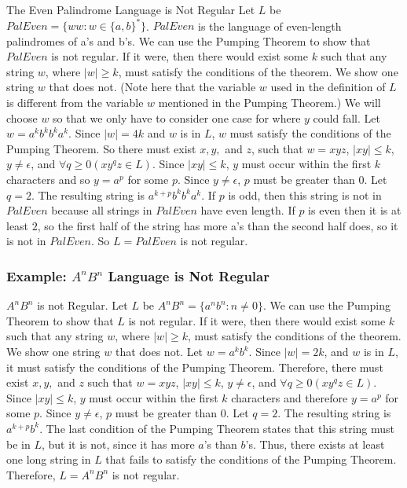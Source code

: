 \documentclass[hidelinks,12pt]{article}
\begin{document}
The Even Palindrome Language is Not Regular Let $L$ be $PalEven = \{ww : w \in
\{a, b\}^*\}$. $PalEven$ is the language of even-length palindromes of a’s and
b’s. We can use the Pumping Theorem to show that $PalEven$ is not regular. If
it were, then there would exist some $k$ such that any string $w$, where $|w|
\geq k$, must satisfy the conditions of the theorem. We show one string $w$
that does not. (Note here that the variable $w$ used in the definition of $L$
is different from the variable $w$ mentioned in the Pumping Theorem.) We will
choose $w$ so that we only have to consider one case for where $y$ could fall.
Let $w = a^kb^kb^ka^k$. Since $|w| = 4k$ and $w$ is in $L$, $w$ must satisfy
the conditions of the Pumping Theorem. So there must exist $x, y,$ and $z$,
such that $w = xyz$, $|xy| \leq k$, $y \neq \epsilon$, and $\forall q \geq 0
(xy^qz \in L)$. Since $|xy| \leq k$, $y$ must occur within the first $k$
characters and so $y = a^p$ for some $p$. Since $y \neq \epsilon$, $p$ must be
greater than $0$. Let $q = 2$. The resulting string is $a^{k+p}b^kb^ka^k$. If
$p$ is odd, then this string is not in $PalEven$ because all strings in
$PalEven$ have even length. If $p$ is even then it is at least $2$, so the
first half of the string has more a’s than the second half does, so it is not
in $PalEven$. So $L = PalEven$ is not regular.

\subsubsection{Example: $A^nB^n$ Language is Not Regular }

$A^nB^n$ is not Regular. Let $L$ be $A^nB^n = \{a^nb^n : n \neq 0\}$. We can
use the Pumping Theorem to show that $L$ is not regular. If it were, then there
would exist some $k$ such that any string $w$, where $|w| \geq k$, must satisfy
the conditions of the theorem. We show one string $w$ that does not. Let $w =
a^kb^k$. Since $|w| = 2k$, and $w$ is in $L$, it must satisfy the conditions of
the Pumping Theorem. Therefore, there must exist $x, y,$ and $z$ such that $w =
xyz$, $|xy| \leq k$, $y \neq \epsilon$, and $\forall q \geq 0 (xy^qz \in L)$.
Since $|xy| \leq k$, $y$ must occur within the first $k$ characters and
therefore $y = a^p$ for some $p$. Since $y \neq \epsilon$, $p$ must be greater
than $0$. Let $q = 2$. The resulting string is $a^{k+p}b^k$. The last condition
of the Pumping Theorem states that this string must be in $L$, but it is not,
since it has more $a$’s than $b$’s. Thus, there exists at least one long string
in $L$ that fails to satisfy the conditions of the Pumping Theorem. Therefore,
$L = A^nB^n$ is not regular.
\end{document}
